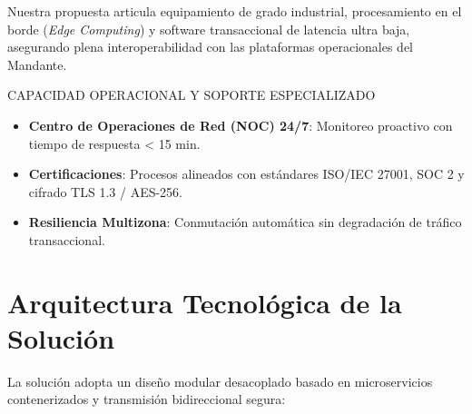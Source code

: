 \documentclass[11pt,letterpaper]{article}
\begin{document}
Nuestra propuesta articula equipamiento de grado industrial, procesamiento en el borde (\textit{Edge Computing}) y software transaccional de latencia ultra baja, asegurando plena interoperabilidad con las plataformas operacionales del Mandante.

\vspace{0.3em}

\begin{corpnote}{CAPACIDAD OPERACIONAL Y SOPORTE ESPECIALIZADO}
  \begin{itemize}[leftmargin=1.2em, itemsep=1pt, topsep=1pt]
    \item \textbf{Centro de Operaciones de Red (NOC) 24/7}: Monitoreo proactivo con tiempo de respuesta < 15 min.
    \item \textbf{Certificaciones}: Procesos alineados con est\'andares ISO/IEC 27001, SOC 2 y cifrado TLS 1.3 / AES-256.
    \item \textbf{Resiliencia Multizona}: Conmutaci\'on autom\'atica sin degradaci\'on de tr\'afico transaccional.
  \end{itemize}
\end{corpnote}

\vspace{0.4em}

\section{Arquitectura Tecnol\'ogica de la Soluci\'on}

La soluci\'on adopta un dise\~no modular desacoplado basado en microservicios contenerizados y transmisi\'on bidireccional segura:

\vspace{0.5em}

\begin{center}
\end{center}
\end{document}
